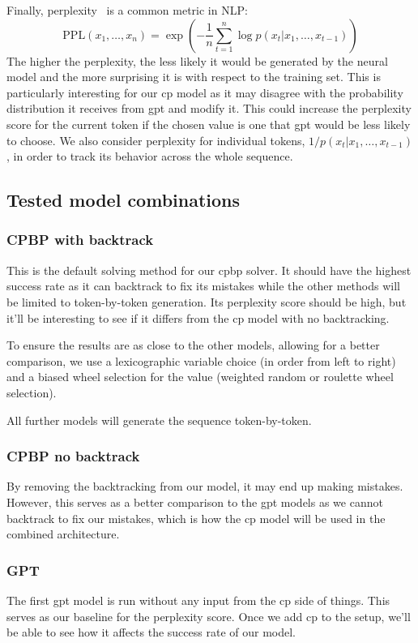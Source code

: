 \documentclass[../Document.tex]{subfiles}
\begin{document}
Finally, perplexity~\cite{perplexity} is a common metric in NLP:
$$
    \mbox{PPL}(x_1,\ldots,x_n) = \exp \left( - \frac{1}{n} \sum_{t=1}^n \log  p(x_t | x_1,\ldots,x_{t-1}) \right)
$$
The higher the perplexity, the less likely it would be generated by the neural model and the more surprising it is with respect to the training set.
This is particularly interesting for our \gls{cp} model as it may disagree with the probability distribution it receives from \gls{gpt} and modify it. This could increase the perplexity score for the current token if the chosen value is one that \gls{gpt} would be less likely to choose.
We also consider perplexity for individual tokens, $1/p(x_t | x_1,\ldots,x_{t-1})$, in order to track its behavior across the whole sequence.


\subsection{Tested model combinations}

\subsubsection{CPBP with backtrack}
This is the default solving method for our \gls{cpbp} solver.
It should have the highest success rate as it can backtrack to fix its mistakes while the other methods will be limited to token-by-token generation.
Its perplexity score should be high, but it'll be interesting to see if it differs from the \gls{cp} model with no backtracking.

To ensure the results are as close to the other models, allowing for a better comparison, we use a lexicographic variable choice (\ie in order from left to right) and a biased wheel selection for the value (\ie weighted random or roulette wheel selection).

All further models will generate the sequence token-by-token.

\subsubsection{CPBP no backtrack}
By removing the backtracking from our model, it may end up making mistakes.
However, this serves as a better comparison to the \gls{gpt} models as we cannot backtrack to fix our mistakes, which is how the \gls{cp} model will be used in the combined architecture.

\subsubsection{GPT}
The first \gls{gpt} model is run without any input from the \gls{cp} side of things.
This serves as our baseline for the perplexity score.
Once we add \gls{cp} to the setup, we'll be able to see how it affects the success rate of our model.
\end{document}
